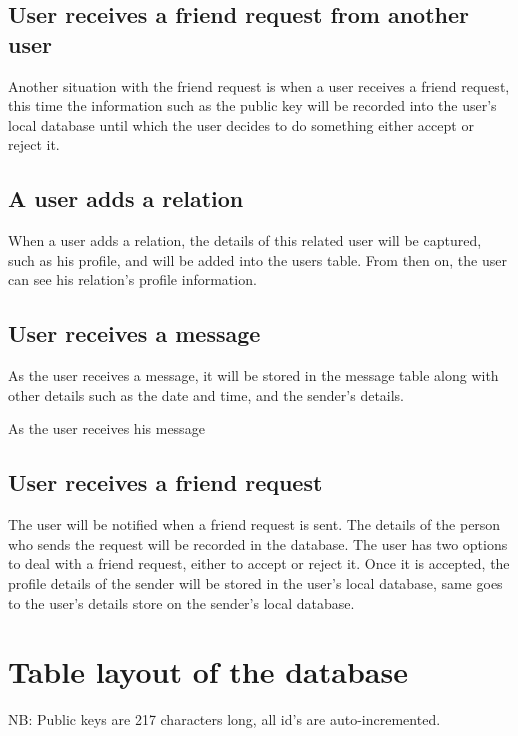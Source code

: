 \subsection{User receives a friend request from another user}
Another situation with the friend request is when a user receives a friend request, this time the information such as the public key will be recorded into the user's local database until which the user decides to do something either accept or reject it.

\subsection{A user adds a relation}
When a user adds a relation, the details of this related user will be captured, such as his profile, and will be added into the users table. From then on, the user can see his relation's profile information. 

\subsection{User receives a message} %
As the user receives a message, it will be stored in the message table along with other details such as the date and time, and the sender's details.

As the user receives his message

\subsection{User receives a friend request}
The user will be notified when a friend request is sent. The details of the person who sends the request will be recorded in the database. The user has two options to deal with a friend request, either to accept or reject it. Once it is accepted, the profile details of the sender will be stored in the user's local database, same goes to the user's details store on the sender's local database.

\clearpage

\section{Table layout of the database}
NB: Public keys are 217 characters long, all id's are auto-incremented.

